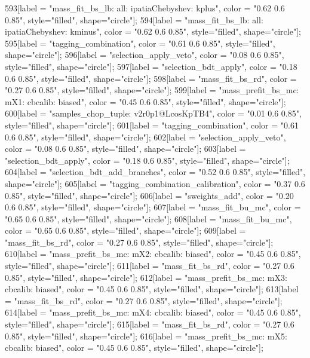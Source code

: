 {	593[label = "mass_fit_bs_lb\nmassbin: all\nmassmodel: ipatiaChebyshev\ntrigger: kplus", color = "0.62 0.6 0.85", style="filled", shape="circle"];
	594[label = "mass_fit_bs_lb\nmassbin: all\nmassmodel: ipatiaChebyshev\ntrigger: kminus", color = "0.62 0.6 0.85", style="filled", shape="circle"];
	595[label = "tagging_combination", color = "0.61 0.6 0.85", style="filled", shape="circle"];
	596[label = "selection_apply_veto", color = "0.08 0.6 0.85", style="filled", shape="circle"];
	597[label = "selection_bdt_apply", color = "0.18 0.6 0.85", style="filled", shape="circle"];
	598[label = "mass_fit_bs_rd", color = "0.27 0.6 0.85", style="filled", shape="circle"];
	599[label = "mass_prefit_bs_mc\nmassbin: mX1\nmassmodel: cbcalib\ntrigger: biased", color = "0.45 0.6 0.85", style="filled", shape="circle"];
	600[label = "samples_chop_tuple\nversion: v2r0p1@LcosKpTB4", color = "0.01 0.6 0.85", style="filled", shape="circle"];
	601[label = "tagging_combination", color = "0.61 0.6 0.85", style="filled", shape="circle"];
	602[label = "selection_apply_veto", color = "0.08 0.6 0.85", style="filled", shape="circle"];
	603[label = "selection_bdt_apply", color = "0.18 0.6 0.85", style="filled", shape="circle"];
	604[label = "selection_bdt_add_branches", color = "0.52 0.6 0.85", style="filled", shape="circle"];
	605[label = "tagging_combination_calibration", color = "0.37 0.6 0.85", style="filled", shape="circle"];
	606[label = "sweights_add", color = "0.20 0.6 0.85", style="filled", shape="circle"];
	607[label = "mass_fit_bu_mc", color = "0.65 0.6 0.85", style="filled", shape="circle"];
	608[label = "mass_fit_bu_mc", color = "0.65 0.6 0.85", style="filled", shape="circle"];
	609[label = "mass_fit_bs_rd", color = "0.27 0.6 0.85", style="filled", shape="circle"];
	610[label = "mass_prefit_bs_mc\nmassbin: mX2\nmassmodel: cbcalib\ntrigger: biased", color = "0.45 0.6 0.85", style="filled", shape="circle"];
	611[label = "mass_fit_bs_rd", color = "0.27 0.6 0.85", style="filled", shape="circle"];
	612[label = "mass_prefit_bs_mc\nmassbin: mX3\nmassmodel: cbcalib\ntrigger: biased", color = "0.45 0.6 0.85", style="filled", shape="circle"];
	613[label = "mass_fit_bs_rd", color = "0.27 0.6 0.85", style="filled", shape="circle"];
	614[label = "mass_prefit_bs_mc\nmassbin: mX4\nmassmodel: cbcalib\ntrigger: biased", color = "0.45 0.6 0.85", style="filled", shape="circle"];
	615[label = "mass_fit_bs_rd", color = "0.27 0.6 0.85", style="filled", shape="circle"];
	616[label = "mass_prefit_bs_mc\nmassbin: mX5\nmassmodel: cbcalib\ntrigger: biased", color = "0.45 0.6 0.85", style="filled", shape="circle"];
}
